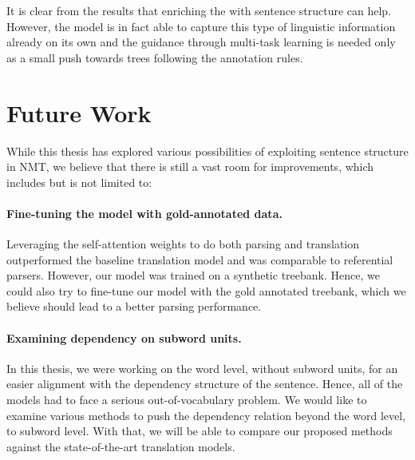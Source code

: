 It is clear from the results that enriching the \transformer with sentence structure can help.
However, the \transformer model is in fact able to capture this type of linguistic information already on its own and the guidance through multi-task learning is needed only as a small push towards trees following the annotation rules.



\section*{Future Work}

While this thesis has explored various possibilities of exploiting sentence structure in NMT, we believe that there is still a vast room for improvements, which includes but is not limited to:

\paragraph{Fine-tuning the \DepParse model with gold-annotated data.}
Leveraging the self-attention weights to do both parsing and translation outperformed the baseline translation model and was comparable to referential parsers.
However, our model was trained on a synthetic treebank.
Hence, we could also try to fine-tune our model with the gold annotated treebank, which we believe should lead to a better parsing performance.

\paragraph{Examining dependency on subword units.}
In this thesis, we were working on the word level, without subword units, for an easier alignment with the dependency structure of the sentence.
Hence, all of the models had to face a serious out-of-vocabulary problem.
We would like to examine various methods to push the dependency relation beyond the word level, to subword level.
With that, we will be able to compare our proposed methods against the state-of-the-art translation models.
